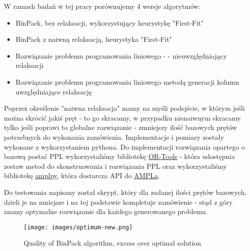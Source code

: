 W ramach badań w tej pracy porównujemy 4 wersje algorytmów:

\begin{itemize}
    \item BinPack, bez relaksacji, wykorzystujący heurystykę "First-Fit"
    \item BinPack z naiwną relaksacją, heurystyka "First-Fit"
    \item Rozwiązanie problemu programowania liniowego - \cite{linear-programming-gilmore} - nieuwzględniający relaksacji
    \item Rozwiązanie problemu programowania liniowego metodą generacji kolumn uwzględniające relaksację
\end{itemize}

Poprzez określenie "naiwna relaksacja" mamy na myśli podejście, w którym jeśli można skrócić jakiś pręt - to go skracamy, w przypadku nienaiwnym skracamy tylko jeśli poprawi to globalne rozwiązanie - zmniejszy ilość bazowych prętów potrzebnych do wykonania zamówienia. Implementacje i pomiary zostały wykonane z wykorzystaniem pythona. Do implementacji rozwiązania opartego o bazową postać PPL \cite{linear-programming-gilmore} wykorzystaliśmy bibliotekę \href{https://developers.google.com/optimization/introduction/python}{OR-Tools} - która udostępnia zestaw metod do skonstruowania i rozwiązania PPL oraz wykorzystaliśmy bibliotekę \href{https://amplpy.ampl.com/en/latest/}{amplpy}, która dostarcza API do \href{https://ampl.com/}{AMPLa}.

Do testowania napisany został skrypt, który dla zadanej ilości prętów bazowych, dzieli je na mniejsze i na tej podstawie kompletuje zamówienie - stąd z góry znamy optymalne rozwiązanie dla każdego generowanego problemu.

\begin{figure*}[!ht]
    \begin{center}
        \texttt{[image: images/optimum-new.png]}
    \end{center}
    \caption{Quality of BinPack algorithm, excess over optimal solution}
    \label{fig:optimum}
\end{figure*}

\FloatBarrier %


